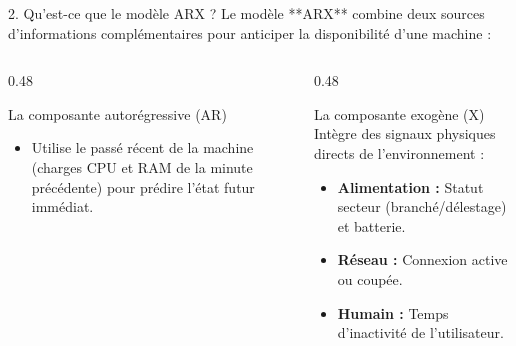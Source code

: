 \documentclass[10pt,aspectratio=169]{beamer}
\begin{document}
\begin{frame}{2. Qu'est-ce que le modèle ARX ?}
  Le modèle **ARX** combine deux sources d'informations complémentaires pour anticiper la disponibilité d'une machine :
  
  \vspace{0.5em}
  \begin{columns}[T]
    \begin{column}{0.48\textwidth}
      \begin{block}{La composante autorégressive (AR)}
        \begin{itemize}
          \item Utilise le passé récent de la machine (charges CPU et RAM de la minute précédente) pour prédire l'état futur immédiat.
        \end{itemize}
      \end{block}
    \end{column}
    
    \begin{column}{0.48\textwidth}
      \begin{block}{La composante exogène (X)}
        Intègre des signaux physiques directs de l'environnement :
        \begin{itemize}
          \item \textbf{Alimentation :} Statut secteur (branché/délestage) et batterie.
          \item \textbf{Réseau :} Connexion active ou coupée.
          \item \textbf{Humain :} Temps d'inactivité de l'utilisateur.
        \end{itemize}
      \end{block}
    \end{column}
  \end{columns}
\end{frame}
\end{document}

